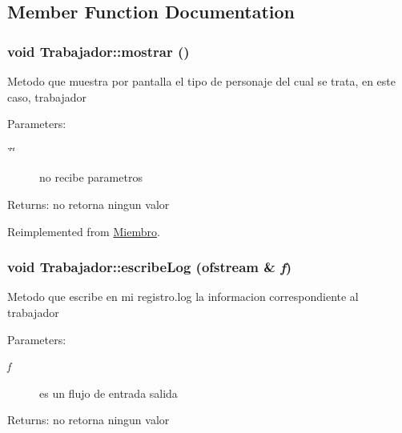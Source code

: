 \subsection{Member Function Documentation}
\hypertarget{classTrabajador_49e5a94181d6a517d9f5213335da1e27}{
\subsubsection[mostrar]{\setlength{\rightskip}{0pt plus 5cm}void Trabajador::mostrar ()}}
\label{classTrabajador_49e5a94181d6a517d9f5213335da1e27}


Metodo que muestra por pantalla el tipo de personaje del cual se trata, en este caso, trabajador \begin{Desc}
\item[Parameters:]
\begin{description}
\item[{\em \char`\"{}\char`\"{}}]no recibe parametros \end{description}
\end{Desc}
\begin{Desc}
\item[Returns:]no retorna ningun valor \end{Desc}


Reimplemented from \hyperlink{classMiembro_28498c7229e81e64d0cb7ea69515dca0}{Miembro}.\hypertarget{classTrabajador_332796b26094df07fa7b8b39c345f8f4}{
\subsubsection[escribeLog]{\setlength{\rightskip}{0pt plus 5cm}void Trabajador::escribeLog (ofstream \& {\em f})}}
\label{classTrabajador_332796b26094df07fa7b8b39c345f8f4}


Metodo que escribe en mi registro.log la informacion correspondiente al trabajador \begin{Desc}
\item[Parameters:]
\begin{description}
\item[{\em f}]es un flujo de entrada salida \end{description}
\end{Desc}
\begin{Desc}
\item[Returns:]no retorna ningun valor \end{Desc}


